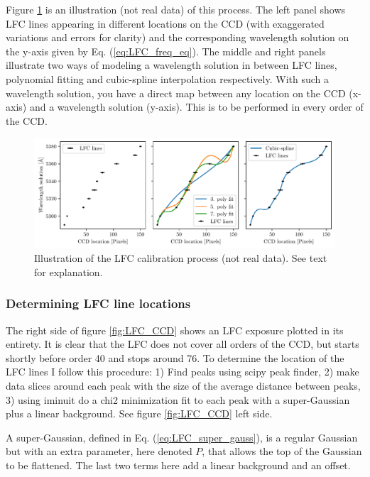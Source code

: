     Figure \ref{fig:calib_illustration} is an illustration (not real data) of this process. The left panel shows LFC lines appearing in different locations on the CCD (with exaggerated variations and errors for clarity) and the corresponding wavelength solution on the y-axis given by Eq. (\ref{eq:LFC_freq_eq}). The middle and right panels illustrate two ways of modeling a wavelength solution in between LFC lines, polynomial fitting and cubic-spline interpolation respectively. With such a wavelength solution, you have a direct map between any location on the CCD (x-axis) and a wavelength solution (y-axis). This is to be performed in every order of the CCD.

    \begin{figure}%
        \begin{wide}  
            \includegraphics[width=\textwidth]{figures/calib/calib_illustration.pdf}
            \caption{Illustration of the LFC calibration process (not real data). See text for explanation.}
            \label{fig:calib_illustration}
        \end{wide}
    \end{figure}

    \subsubsection{Determining LFC line locations}
    The right side of figure \ref{fig:LFC_CCD} shows an LFC exposure plotted in its entirety. It is clear that the LFC does not cover all orders of the CCD, but starts shortly before order 40 and stops around 76. To determine the location of the LFC lines I follow this procedure: 1) Find peaks using scipy peak finder, 2) make data slices around each peak with the size of the average distance between peaks, 3) using iminuit do a chi2 minimization fit to each peak with a super-Gaussian plus a linear background. See figure \ref{fig:LFC_CCD} left side.

    A super-Gaussian, defined in Eq. (\ref{eq:LFC_super_gauss}), is a regular Gaussian but with an extra parameter, here denoted $P$, that allows the top of the Gaussian to be flattened. The last two terms here add a linear background and an offset.  
    
